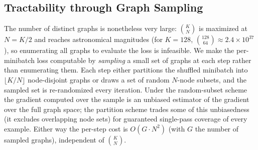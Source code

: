 \documentclass[11pt,letterpaper]{article}
\begin{document}
\subsection{Tractability through Graph Sampling}
\label{sec:sampling}

The number of distinct graphs is nonetheless very large: $\binom{K}{N}$ is maximized
at $N = K/2$ and reaches astronomical magnitudes (for $K = 128$,
$\binom{128}{64} \approx 2.4 \times 10^{37}$), so enumerating all graphs to evaluate
the loss is infeasible. We make the per-minibatch loss computable by \emph{sampling}
a small set of graphs at each step rather than enumerating them. Each step either
partitions the shuffled minibatch into $\lfloor K/N \rfloor$ node-disjoint graphs or
draws a set of random $N$-node subsets, and the sampled set is re-randomized every
iteration. Under the random-subset scheme the gradient computed over the sample is an
unbiased estimator of the gradient over the full graph space; the partition scheme
trades some of this unbiasedness (it excludes overlapping node sets) for guaranteed
single-pass coverage of every example. Either way the per-step cost is
$O(G \cdot N^2)$ (with $G$ the number of sampled graphs), independent of
$\binom{K}{N}$.
\end{document}

